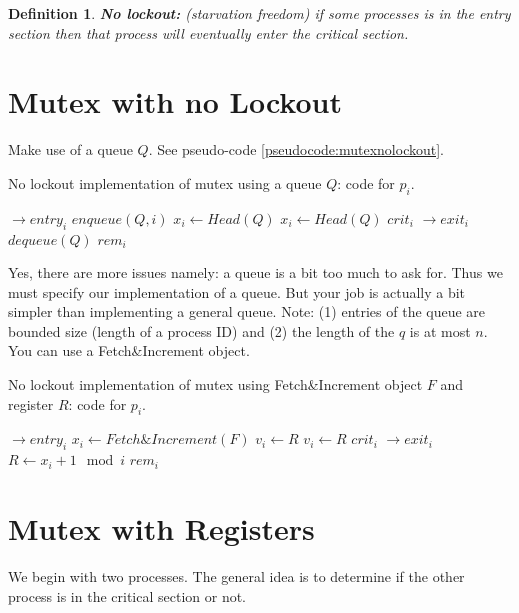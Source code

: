 \documentclass[twoside]{article}
\newtheorem{definition}[theorem]{Definition}
\begin{document}
\begin{definition}
\textbf{No lockout:} (starvation freedom) if some processes is in the entry section then that process will eventually enter the critical section.  
\end{definition}

\section{Mutex with no Lockout}
Make use of a queue $Q$. See pseudo-code \ref{pseudocode:mutexnolockout}.
\begin{algorithm}
	\caption{No lockout implementation of mutex using a queue $Q$: code for $p_i$.}
    \label{pseudocode:mutexnolockout}
    \begin{algorithmic}[1]
    \State $\rightarrow entry_i$
	\State $enqueue(Q, i)$
	\State $x_i \leftarrow Head(Q)$
		\State $x_i \leftarrow Head(Q)$
	\EndWhile
	\State $crit_i$
	\State
	\State $\rightarrow exit_i$
	\State $dequeue(Q)$
	\State $rem_i$
	\end{algorithmic}
\end{algorithm}

Yes, there are more issues namely: a queue is a bit too much to ask for. Thus we must specify our implementation of a queue. But your job is actually a bit simpler than implementing a general queue. Note: (1) entries of the queue are bounded size (length of a process ID) and (2) the length of the $q$ is at most $n$. You can use a Fetch\&Increment object.

\begin{algorithm}
	\caption{No lockout implementation of mutex using Fetch\&Increment object $F$ and register $R$: code for $p_i$.}
    \label{pseudocode:mutexFNI}
    \begin{algorithmic}[1]
    \State $\rightarrow entry_i$
	\State $x_i \leftarrow Fetch\&Increment(F)$
	\State $v_i \leftarrow R$
		\State $v_i \leftarrow R$
	\EndWhile
	\State $crit_i$
	\State
	\State $\rightarrow exit_i$
	\State $R \leftarrow x_i + 1 \mod i$
	\State $rem_i$
	\end{algorithmic}
\end{algorithm} 

\section{Mutex with Registers}
We begin with two processes. The general idea is to determine if the other process is in the critical section or not.
\end{document}
